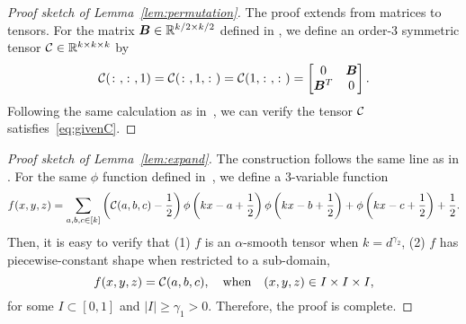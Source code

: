 \documentclass[11pt]{article}
\theoremstyle{definition}
\begin{document}
\begin{proof}[Proof sketch of Lemma~\ref{lem:permutation}]
The proof extends \citet[Theorem 2.2, page 26]{gao2015rate} from matrices to tensors. 
For the matrix $\bm B\in\mathbb{R}^{k/2\times k/2}$ defined in \citet[Theorem 2.2, page]{gao2015rate}, we define an order-3 symmetric tensor $\mathcal{C}\in\mathbb{R}^{k\times k\times k}$ by
\[
\mathcal{C}(\colon,\colon,1)=\mathcal{C}(\colon,1,\colon)=\mathcal{C}(1,\colon,\colon)=
\begin{bmatrix}
0&\bm B\\
\bm B^T&0
\end{bmatrix}.
\]
Following the same calculation as in~\cite{gao2015rate}, we can verify the tensor $\mathcal{C}$ satisfies~\eqref{eq:givenC}.
\end{proof}

\begin{proof}[Proof sketch of Lemma~\ref{lem:expand}]
The construction follows the same line as in \citet[Supplement, page 3]{gao2015rate}. For the same $\phi$ function defined in~\cite{gao2015rate}, we define a 3-variable function
\[
f(x,y,z)=\sum_{a,b,c\in[k]}\left(\mathcal{C}(a,b,c)-{1\over 2}\right)\phi\left(kx-a+{1\over 2}\right)\phi\left(kx-b+{1\over 2}\right)+\phi\left(kx-c+{1\over 2}\right)+{1\over 2}.
\]
Then, it is easy to verify that (1) $f$ is an $\alpha$-smooth tensor when $k=d^{\gamma_2}$, (2) $f$ has piecewise-constant shape when restricted to a sub-domain,
\[
f(x,y,z)=\mathcal{C}(a,b,c),\quad \text{when}\quad (x,y,z)\in I\times I\times I,
\]
for some $I\subset[0,1]$ and $|I|\geq \gamma_1>0$. Therefore, the proof is complete. 
\end{proof}


\end{document}
